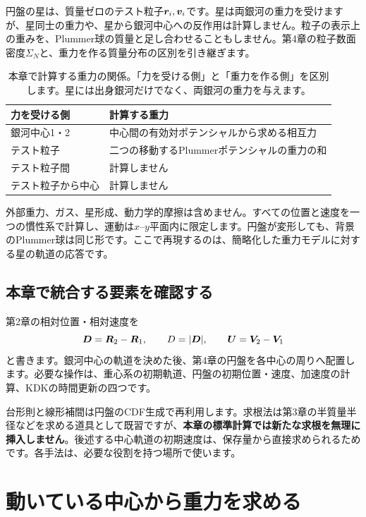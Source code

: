 円盤の星は、質量ゼロのテスト粒子$\boldsymbol r_i,\boldsymbol v_i$です。星は両銀河の重力を受けますが、星同士の重力や、星から銀河中心への反作用は計算しません。粒子の表示上の重みを、Plummer球の質量と足し合わせることもしません。第4章の粒子数面密度$\Sigma_N$と、重力を作る質量分布の区別を引き継ぎます。

\begin{table}[htbp]
\centering
\caption{本章で計算する重力の関係。「力を受ける側」と「重力を作る側」を区別します。星には出身銀河だけでなく、両銀河の重力を与えます。}
\label{tab:ch5-coupling}
\begin{tabularx}{\linewidth}{lX}
\toprule
力を受ける側 & 計算する重力 \\
\midrule
銀河中心1・2 & 中心間の有効対ポテンシャルから求める相互力 \\
テスト粒子 & 二つの移動するPlummerポテンシャルの重力の和 \\
テスト粒子間 & 計算しません \\
テスト粒子から中心 & 計算しません \\
\bottomrule
\end{tabularx}
\end{table}

外部重力、ガス、星形成、動力学的摩擦は含めません。すべての位置と速度を一つの慣性系で計算し、運動は$x$--$y$平面内に限定します。円盤が変形しても、背景のPlummer球は同じ形です。ここで再現するのは、簡略化した重力モデルに対する星の軌道の応答です。

\subsection{本章で統合する要素を確認する}
第2章の相対位置・相対速度を
\begin{equation}
\boldsymbol D=\boldsymbol R_2-\boldsymbol R_1,\qquad D=|\boldsymbol D|,\qquad \boldsymbol U=\boldsymbol V_2-\boldsymbol V_1
\label{eq:ch5-relative}
\end{equation}
と書きます。銀河中心の軌道を決めた後、第4章の円盤を各中心の周りへ配置します。必要な操作は、重心系の初期軌道、円盤の初期位置・速度、加速度の計算、KDKの時間更新の四つです。

台形則と線形補間は円盤のCDF生成で再利用します。求根法は第3章の半質量半径などを求める道具として既習ですが、\textbf{本章の標準計算では新たな求根を無理に挿入しません}。後述する中心軌道の初期速度は、保存量から直接求められるためです。各手法は、必要な役割を持つ場所で使います。

\section{動いている中心から重力を求める}
\label{sec:ch5-gravity}
